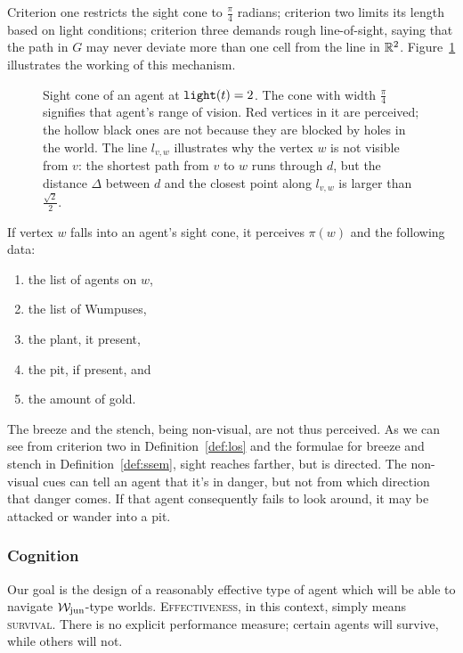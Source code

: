 Criterion one restricts the sight cone to $\frac{\pi}{4}$ radians; criterion two limits its length based on light conditions; criterion three demands rough line-of-sight, saying that the path in $G$ may never deviate more than one cell from the line in $\mathbb{R}^2$. Figure~\ref{fig:los} illustrates the working of this mechanism.
%
\begin{figure}
	\centering
	
	\caption{Sight cone of an agent at $\mathtt{light}(t) = 2$. The cone with width $\frac{\pi}{4}$ signifies that agent's range of vision. Red vertices in it are perceived; the hollow black ones are not because they are blocked by holes in the world. The line $l_{v,w}$ illustrates why the vertex $w$ is not visible from $v$: the shortest path from $v$ to $w$ runs through $d$, but the distance $\Delta$ between $d$ and the closest point along $l_{v,w}$ is larger than $\frac{\sqrt{2}}{2}$.}
	\label{fig:los}
\end{figure}
%
If vertex $w$ falls into an agent's sight cone, it perceives $\pi(w)$ and the following data:

\begin{enumerate}
	\item the list of agents on $w$,
	\item the list of Wumpuses,
	\item the plant, it present,
	\item the pit, if present, and
	\item the amount of gold.
\end{enumerate}

The breeze and the stench, being non-visual, are not thus perceived. As we can see from criterion two in Definition~\ref{def:los} and the formulae for breeze and stench in Definition~\ref{def:ssem}, sight reaches farther, but is directed. The non-visual cues can tell an agent that it's in danger, but not from which direction that danger comes. If that agent consequently fails to look around, it may be attacked or wander into a pit.

\subsubsection{Cognition}

Our goal is the design of a reasonably effective type of agent which will be able to navigate $\mathcal{W}_{\mathrm{jun}}$-type worlds. \textsc{Effectiveness}, in this context, simply means \textsc{survival}. There is no explicit performance measure; certain agents will survive, while others will not.

